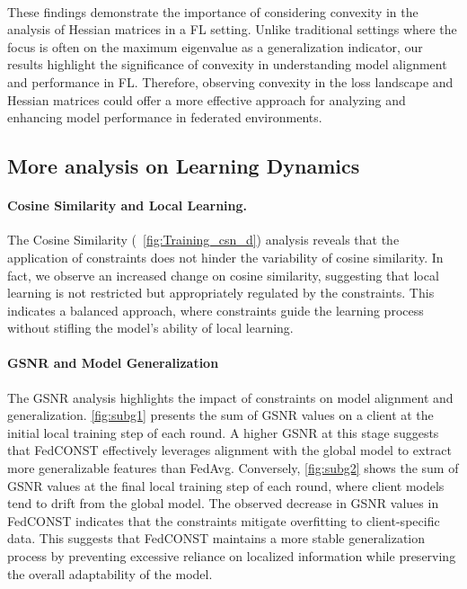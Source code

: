 \documentclass{article}
\theoremstyle{plain}
\theoremstyle{definition}
\theoremstyle{remark}
\begin{document}
\paragraph{}
These findings demonstrate the importance of considering convexity in the analysis of Hessian matrices in a FL setting. Unlike traditional settings where the focus is often on the maximum eigenvalue as a generalization indicator, our results highlight the significance of convexity in understanding model alignment and performance in FL. Therefore, observing convexity in the loss landscape and Hessian matrices could offer a more effective approach for analyzing and enhancing model performance in federated environments.

\subsection{More analysis on Learning Dynamics}
\paragraph{Cosine Similarity and Local Learning.}
The Cosine Similarity (~\cref{fig:Training_csn_d}) analysis reveals that the application of constraints does not hinder the variability of cosine similarity. In fact, we observe an increased change on cosine similarity, suggesting that local learning is not restricted but appropriately regulated by the constraints. This indicates a balanced approach, where constraints guide the learning process without stifling the model's ability of local learning.

\paragraph{GSNR and Model Generalization}
The GSNR analysis highlights the impact of constraints on model alignment and generalization. \cref{fig:subg1} presents the sum of GSNR values on a client at the initial local training step of each round. A higher GSNR at this stage suggests that FedCONST effectively leverages alignment with the global model to extract more generalizable features than FedAvg. Conversely, \cref{fig:subg2} shows the sum of GSNR values at the final local training step of each round, where client models tend to drift from the global model. The observed decrease in GSNR values in FedCONST indicates that the constraints mitigate overfitting to client-specific data. This suggests that FedCONST maintains a more stable generalization process by preventing excessive reliance on localized information while preserving the overall adaptability of the model.
\end{document}

